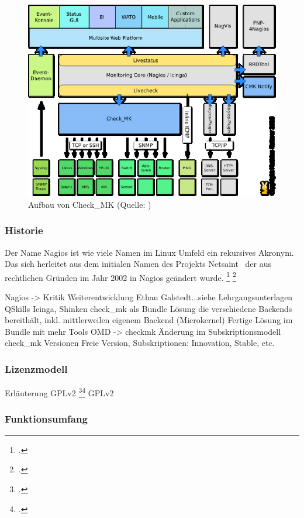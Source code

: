 \documentclass[12pt,a4paper,parskip]{scrreprt}
\begin{document}
	\begin{figure}
	\centering
	\includegraphics[width=1\textwidth]{pics/OMD_Schema.eps}
    \caption[Aufbau von Check\_MK]{Aufbau von Check\_MK (Quelle: \cite{checkmk})}
	\end{figure}
	\subsubsection{Historie}
	Der Name Nagios ist wie viele Namen im Linux Umfeld ein rekursives Akronym. Das sich herleitet aus dem initialen Namen des Projekts \glqq Netsaint \grqq\ der aus rechtlichen Gründen im Jahr 2002 in Nagios geändert wurde. 
	\footcite{nagioshistory} \footcite{nagiosnamefaq}
	
	Nagios -> Kritik Weiterentwicklung Ethan Galstedt...siehe Lehrgangsunterlagen QSkills
	Icinga, Shinken
	check\_mk als Bundle Lösung die verschiedene Backends bereithält, inkl. mittlerweilen eigenem Backend (Microkernel)
	Fertige Lösung im Bundle mit mehr Tools
	OMD -> checkmk Änderung im Subskriptionsmodell
	check\_mk Versionen Freie Version, Subskriptionen: Innovation, Stable, etc.
	
	\subsubsection{Lizenzmodell}
	Erläuterung GPLv2 \footcite{gplv2de}\footcite{gplv2en}
	\gls{GPLv2}
	\subsubsection{Funktionsumfang}
	
\end{document}
